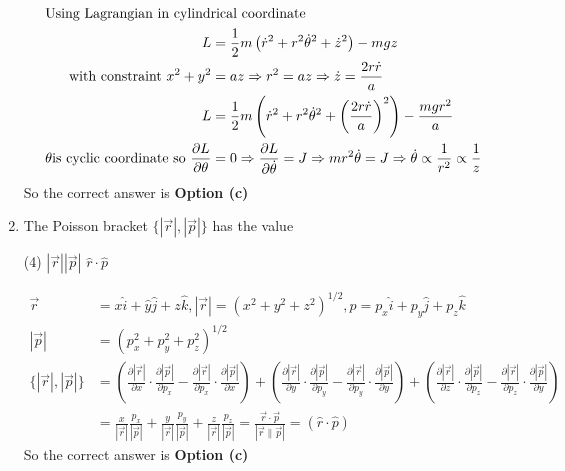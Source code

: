 \begin{enumerate}
\begin{answer}
	\begin{align*}
	\intertext{Using Lagrangian in cylindrical coordinate}
	L&=\frac{1}{2} m\left(\dot{r}^{2}+r^{2} \dot{\theta}^{2}+\dot{z}^{2}\right)-m g z \\\text{ with constraint }x^{2}+y^{2}&=a z \Rightarrow r^{2}=a z \Rightarrow \dot{z}=\frac{2 r \dot{r}}{a}\\
	L&=\frac{1}{2} m\left(\dot{r}^{2}+r^{2} \dot{\theta}^{2}+\left(\frac{2 r \dot{r}}{a}\right)^{2}\right)-\frac{m g r^{2}}{a}\\
	\theta \text{is cyclic coordinate so }\frac{\partial L}{\partial \theta}&=0 \Rightarrow \frac{\partial L}{\partial \dot{\theta}}=J \Rightarrow m r^{2} \dot{\theta}=J \Rightarrow \dot{\theta} \propto \frac{1}{r^{2}} \propto \frac{1}{z}
	\end{align*}
	So the correct answer is \textbf{Option (c)}
\end{answer}
	\item  The Poisson bracket $\{|\vec{r}|,|\vec{p}|\}$ has the value
	{}
	\begin{tasks}(4)
		\task[\textbf{a.}]$|\vec{r}||\vec{p}|$
		\task[\textbf{b.}]$\hat{r} \cdot \hat{p}$
	\end{tasks}
\begin{answer}
	\begin{align*}
	\vec{r}&=x \hat{i}+\hat{y} \hat{j}+z \hat{k},|\vec{r}|=\left(x^{2}+y^{2}+z^{2}\right)^{1 / 2}, p=p_{x} \hat{i}+p_{y} \hat{j}+p_{z} \hat{k}\\
	|\vec{p}|&=\left(p_{x}^{2}+p_{y}^{2}+p_{z}^{2}\right)^{1 / 2}\\
	\{|\vec{r}|,|\vec{p}|\}&=\left(\frac{\partial|\vec{r}|}{\partial x} \cdot \frac{\partial|\vec{p}|}{\partial p_{x}}-\frac{\partial|\vec{r}|}{\partial p_{x}} \cdot \frac{\partial|\vec{p}|}{\partial x}\right)+\left(\frac{\partial|\vec{r}|}{\partial y} \cdot \frac{\partial|\vec{p}|}{\partial p_{y}}-\frac{\partial|\vec{r}|}{\partial p_{y}} \cdot \frac{\partial|\vec{p}|}{\partial y}\right)+\left(\frac{\partial|\vec{r}|}{\partial z} \cdot \frac{\partial|\vec{p}|}{\partial p_{z}}-\frac{\partial|\vec{r}|}{\partial p_{z}} \cdot \frac{\partial|\vec{p}|}{\partial y}\right)\\
	&=\frac{x}{|\vec{r}|} \frac{p_{x}}{|\vec{p}|}+\frac{y}{|\vec{r}|} \frac{p_{y}}{|\vec{p}|}+\frac{z}{|\vec{r}|} \frac{p_{z}}{|\vec{p}|}=\frac{\vec{r} \cdot \vec{p}}{|\vec{r} \| \vec{p}|}=(\hat{r} \cdot \hat{p})
	\end{align*}
	So the correct answer is \textbf{Option (c)}

\end{answer}
\end{enumerate}
